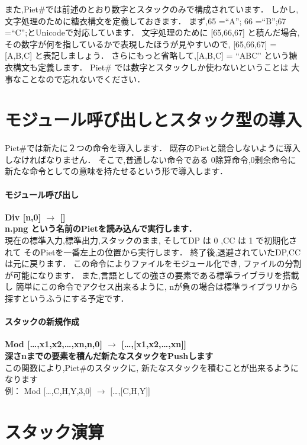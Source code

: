 また,Piet\#では前述のとおり数字とスタックのみで構成されています．
しかし,文字処理のために糖衣構文を定義しておきます． まず,65 =``A''; 66
=``B'';67 =``C'';とUnicodeで対応しています． 文字処理のために
{[}65,66,67{]} と積んだ場合,
その数字が何を指しているかで表現したほうが見やすいので, {[}65,66,67{]} =
{[}A,B,C{]} と表記しましょう． さらにもっと省略して,{[}A,B,C{]} = ``ABC''
という糖衣構文も定義します． Piet\#
では数字とスタックしか使わないということは
大事なことなので忘れないでください．　　

\section{モジュール呼び出しとスタック型の導入}

Piet\#では新たに２つの命令を導入します．
既存のPietと競合しないように導入しなければなりません．
そこで,普通しない命令である 0除算命令,0剰余命令に
新たな命令としての意味を持たせるという形で導入します．

\paragraph{モジュール呼び出し}

\textbf{Div {[}n,0{]} $\to$ {[}{]}}\\\textbf{n.png
という名前のPietを読み込んで実行します．}\\現在の標準入力,標準出力,スタックのまま,
そしてDP は 0 ,CC は 1 で初期化されて
そのPietを一番左上の位置から実行します．
終了後,退避されていたDP,CCは元に戻ります．
この命令によりファイルをモジュール化でき,
ファイルの分割が可能になります．
また,言語としての強さの要素である標準ライブラリを搭載し
簡単にこの命令でアクセス出来るように,
nが負の場合は標準ライブラリから探すというふうにする予定です．

\paragraph{スタックの新規作成}

\textbf{Mod {[}\ldots{},x1,x2,\ldots{},xn,n,0{]} $\to$
{[}\ldots{},{[}x1,x2,\ldots{},xn{]}{]}}\\\textbf{深さnまでの要素を積んだ新たなスタックをPushします}\\この関数により,Piet\#のスタックに,
新たなスタックを積むことが出来るようになります\\例： Mod
{[}\ldots{},C,H,Y,3,0{]} $\to$ {[}\ldots{},{[}C,H,Y{]}{]}

\section{スタック演算}

